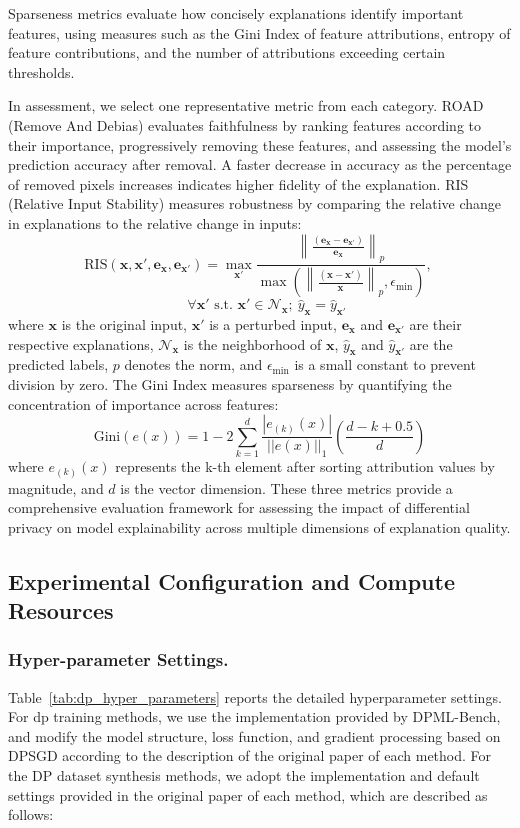 \documentclass{article}
\begin{document}
Sparseness metrics evaluate how concisely explanations identify important features, using measures such as the Gini Index of feature attributions, entropy of feature contributions, and the number of attributions exceeding certain thresholds.

In assessment, we select one representative metric from each category. ROAD (Remove And Debias) evaluates faithfulness by ranking features according to their importance, progressively removing these features, and assessing the model's prediction accuracy after removal. A faster decrease in accuracy as the percentage of removed pixels increases indicates higher fidelity of the explanation. RIS (Relative Input Stability) measures robustness by comparing the relative change in explanations to the relative change in inputs:
\[
\text{RIS}(\mathbf{x}, \mathbf{x}', \mathbf{e}_\mathbf{x}, \mathbf{e}_{\mathbf{x}'}) = \max_{\mathbf{x}'} \frac{\left\|\frac{(\mathbf{e}_\mathbf{x} - \mathbf{e}_{\mathbf{x}'})}{\mathbf{e}_\mathbf{x}}\right\|_p}{\max(\left\|\frac{(\mathbf{x}-\mathbf{x}')}{\mathbf{x}}\right\|_p, \epsilon_{\min})}, \
\]
\[
\quad \forall \mathbf{x}' \text{ s.t. } \mathbf{x}' \in \mathcal{N}_\mathbf{x}; \ \hat{y}_\mathbf{x} = \hat{y}_{\mathbf{x}'}
\]
where $\mathbf{x}$ is the original input, $\mathbf{x}'$ is a perturbed input, $\mathbf{e}_\mathbf{x}$ and $\mathbf{e}_{\mathbf{x}'}$ are their respective explanations, $\mathcal{N}_\mathbf{x}$ is the neighborhood of $\mathbf{x}$, $\hat{y}_\mathbf{x}$ and $\hat{y}_{\mathbf{x}'}$ are the predicted labels, $p$ denotes the norm, and $\epsilon_{\min}$ is a small constant to prevent division by zero. The Gini Index measures sparseness by quantifying the concentration of importance across features:
\[
\text{Gini}(e(x)) = 1 - 2\sum_{k=1}^d \frac{|e_{(k)}(x)|}{||e(x)||_1}\left(\frac{d-k+0.5}{d}\right)
\]
where $e_{(k)}(x)$ represents the k-th element after sorting attribution values by magnitude, and $d$ is the vector dimension. These three metrics provide a comprehensive evaluation framework for assessing the impact of differential privacy on model explainability across multiple dimensions of explanation quality.

\subsection{Experimental Configuration and Compute Resources}
\subsubsection{Hyper-parameter Settings. }\label{app:hyper-parameter_settings}
Table~\ref{tab:dp_hyper_parameters} reports the detailed hyperparameter settings. For dp training methods, we use the implementation provided by DPML-Bench, and modify the model structure, loss function, and gradient processing based on DPSGD according to the description of the original paper of each method. For the DP dataset synthesis methods, we adopt the implementation and default settings provided in the original paper of each method, which are described as follows: 
\end{document}
